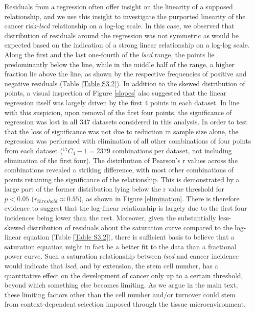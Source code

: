 \documentclass[9pt,twocolumn,twoside]{pnas-new}
\begin{document}
		Residuals from a regression often offer insight on the linearity of a supposed relationship, and we use this insight to investigate the purported linearity of the cancer risk-\textit{lscd} relationship on a log-log scale. In this case, we observed that distribution of residuals around the regression was not symmetric as would be expected based on the indication of a strong linear relationship on a log-log scale. Along the first and the last one-fourth of the \textit{lscd} range, the points lie predominantly below the line, while in the middle half of the range, a higher fraction lie above the line, as shown by the respective frequencies of positive and negative residuals (Table \ref{Table S3.2}). In addition to the skewed distribution of points, a visual inspection of Figure \ref{slopes} also suggested that the linear regression itself was largely driven by the first $4$ points in each dataset. In line with this suspicion, upon removal of the first four points, the significance of regression was lost in all $347$ datasets considered in this analysis. In order to test that the loss of significance was not due to reduction in sample size alone, the regression was performed with elimination of all other combinations of four points from each dataset ($^{17}C_{4}-1=2379$ combinations per dataset, not including elimination of the first four). The distribution of Pearson's r values across the combinations revealed a striking difference, with most other combinations of points retaining the significance of the relationship. This is demonstrated by a large part of the former distribution lying below the r value threshold for $p<0.05$ ($r_{threshold}\approx0.55$), as shown in Figure \ref{elimination}. There is therefore evidence to suggest that the log-linear relationship is largely due to the first four incidences being lower than the rest. Moreover, given the substantially less-skewed distribution of residuals about the saturation curve compared to the log-linear equation (Table \ref{Table S3.2}), there is sufficient basis to believe that a saturation equation might in fact be a better fit to the data than a fractional power curve. Such a saturation relationship between \textit{lscd} and cancer incidence  would indicate that \textit{lscd}, and by extension, the stem cell number, has a quantitative effect on the development of cancer only up to a certain threshold, beyond which something else becomes limiting. As we argue in the main text, these limiting factors other than the cell number and/or turnover could stem from context-dependent selection imposed through the tissue microenvironment.

		
		
\end{document}

